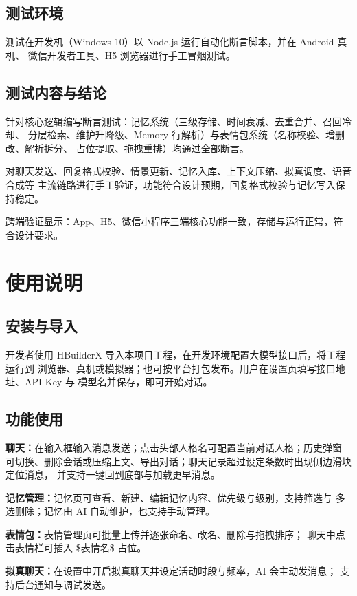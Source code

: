 \documentclass[zihao=5,a4paper]{ctexart}
\begin{document}
\subsection{测试环境}
测试在开发机（Windows 10）以 Node.js 运行自动化断言脚本，并在 Android 真机、
微信开发者工具、H5 浏览器进行手工冒烟测试。

\subsection{测试内容与结论}
针对核心逻辑编写断言测试：记忆系统（三级存储、时间衰减、去重合并、召回冷却、
分层检索、维护升降级、Memory 行解析）与表情包系统（名称校验、增删改、解析拆分、
占位提取、拖拽重排）均通过全部断言。

对聊天发送、回复格式校验、情景更新、记忆入库、上下文压缩、拟真调度、语音合成等
主流链路进行手工验证，功能符合设计预期，回复格式校验与记忆写入保持稳定。

跨端验证显示：App、H5、微信小程序三端核心功能一致，存储与运行正常，符合设计要求。

\section{使用说明}

\subsection{安装与导入}
开发者使用 HBuilderX 导入本项目工程，在开发环境配置大模型接口后，将工程运行到
浏览器、真机或模拟器；也可按平台打包发布。用户在设置页填写接口地址、API Key 与
模型名并保存，即可开始对话。

\subsection{功能使用}
\textbf{聊天：}在输入框输入消息发送；点击头部人格名可配置当前对话人格；历史弹窗
可切换、删除会话或压缩上文、导出对话；聊天记录超过设定条数时出现侧边滑块定位消息，
并支持一键回到底部与加载更早消息。

\textbf{记忆管理：}记忆页可查看、新建、编辑记忆内容、优先级与级别，支持筛选与
多选删除；记忆由 AI 自动维护，也支持手动管理。

\textbf{表情包：}表情管理页可批量上传并逐张命名、改名、删除与拖拽排序；
聊天中点击表情栏可插入 \$表情名\$ 占位。

\textbf{拟真聊天：}在设置中开启拟真聊天并设定活动时段与频率，AI 会主动发消息；
支持后台通知与调试发送。
\end{document}
